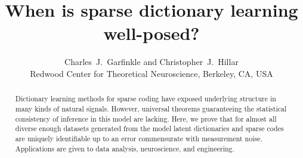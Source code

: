 \documentclass[journal, twocolumn]{IEEEtran}
\begin{document}
\title{When is sparse dictionary learning well-posed?}

\author{Charles~J.~Garfinkle and Christopher~J.~Hillar \\
Redwood Center for Theoretical Neuroscience, Berkeley, CA, USA
}
\maketitle

\begin{abstract}
Dictionary learning methods for sparse coding have exposed underlying structure in many kinds of natural signals.  
However, universal theorems guaranteeing the statistical consistency of inference in this model are lacking.  
Here, we prove that for almost all diverse enough datasets generated from the model latent dictionaries and sparse 
codes are uniquely identifiable up to an error commensurate with measurement noise. 
Applications are given to data analysis, neuroscience, and engineering.
\end{abstract}



\end{document}
